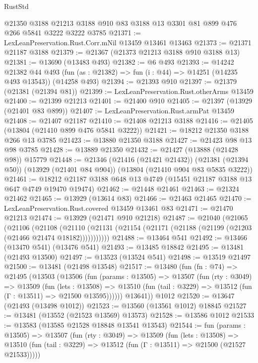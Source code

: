 \begin{lexlean}{RustStd}
\begin{coremodule}
    @21350
    @3188
    @21213
    @3188
    @910
    @83
    @3188
    @13
    @3301
    @81
    @899
    @476
    @266
    @5841
    @3222
    @3222
    @3785
@21371 := LexLeanPreservation.Rust.Corr.mNil @13459 @13461 @13463
@21373 := @21371 @21187 @3188
@21379 := @21367 (@21373 @21213 @3188 @910 @3188 @13)
@21381 := @13690 (@13483 @493)
@21382 := @6 @493
@21393 := @14242
    @21382
    @44
    @493
    (fun (as : @21382) => fun (i : @44) => @14251 (@14235 @493 @13543))
    (@14258 @493)
@21394 := @21393 @910
@21397 := @21379 (@21381 (@21394 @81))
@21399 := LexLeanPreservation.Rust.otherArms @13459
@21400 := @21399 @21213
@21401 := @21400 @910
@21405 := @21397 (@13929 (@21401 @83 @899))
@21407 := LexLeanPreservation.Rust.armPat @13459
@21408 := @21407 @21187
@21410 := @21408 @21213 @3188
@21416 := @21405 (@13804 (@21410 @899 @476 @5841 @3222))
@21421 := @18212 @21350 @3188 @266 @13 @3785
@21423 := @13880 @21350 @3188
@21427 := @21423 @98 @13 @98 @3785
@21428 := @13889 @21350
@21432 := @21427 (@13888 (@21428 @98)) @15779
@21448 := @21346
    (@21416 (@21421 @21432))
    (@21381 (@21394 @50))
    (@13929 (@21401 @84 @904))
    (@13804 (@21410 @904 @83 @5835 @3222))
@21461 := @18212 @21187 @3188 @648 @13 @4749 (@15451 @21187 @3188 @13 @647 @4749 @19470 @19474)
@21462 := @21448 @21461
@21463 := @21324 @21462
@21465 := @13929 (@13614 @83)
@21466 := @21463 @21465
@21470 := LexLeanPreservation.Rust.covered @13459 @13461 @83
@21471 := @21470 @21213
@21474 := @13929 (@21471 @910 @21218)
@21487 := @21040
    (@21065
      (@21106
        (@21108
          (@21110 (@21131 (@21154 (@21171 (@21188 (@21199 (@21203 (@21466 @21474 @18182)))))))))))
@21488 := @13464 @541
@21492 := @13466 (@13470 @541) (@13476 @541)
@21493 := @13485 @18842
@21495 := @13481 (@21493 @13500)
@21497 := @13523 (@13524 @541)
@21498 := @13519 @21497
@21500 := @13481 (@21498 @13548)
@21517 := @13480
    (fun (fn : @74) =>
    @21495
      (@13503
        (@13506
          (fun (params : @13505) =>
          @13507
            (fun (rty : @3049) =>
            @13509
              (fun (lets : @13508) =>
              @13510 (fun (tail : @3229) => @13512 (fun (Γ : @13511) => @21500 @13595))))))
        @13641))
    @1012
@21520 := @13647 (@21493 (@13498 @1012))
@21523 := @13560 (@13561 @1012) @18845
@21527 := @13481 (@13552 (@21523 @13569) @13573)
@21528 := @13586 @1012
@21533 := @13583 (@13585 @21528 @18848 @13541 @13543)
@21544 := fun (params : @13505) =>
  @13507
    (fun (rty : @3049) =>
    @13509
      (fun (lets : @13508) =>
      @13510 (fun (tail : @3229) => @13512 (fun (Γ : @13511) => @21500 (@21527 @21533)))))

\end{coremodule}
\end{lexlean}
